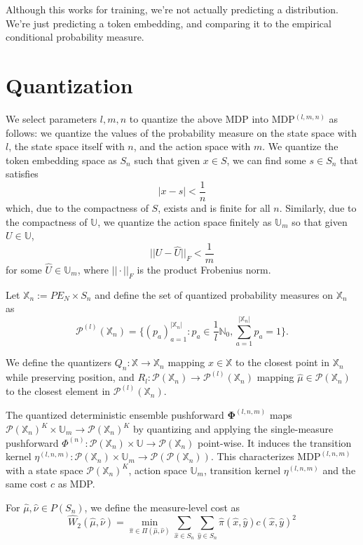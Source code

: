 \documentclass{article}
\begin{document}
Although this works for training, we're not actually predicting a distribution. We're just predicting a token embedding, and comparing it to the empirical conditional probability measure. 

\section{Quantization}

We select parameters $l, m, n$ to quantize the above MDP into MDP$^{(l, m, n)}$ as follows: we quantize the values of the probability measure on the state space with $l$, the state space itself with $n$, and the action space with $m$. 
We quantize the token embedding space as $S_n$ such that given $x \in S$, we can find some $s \in S_n$ that satisfies
$$|x - s| < \frac{1}{n}$$
which, due to the compactness of $S$, exists and is finite for all $n$. Similarly, due to the compactness of $\mathbb{U}$, we quantize the action space finitely as $\mathbb{U}_m$ so that given $U \in \mathbb{U}$,
$$||U - \hat U||_F < \frac{1}{m}$$
for some $\hat U \in \mathbb{U}_m$, where $||\cdot ||_F$ is the product Frobenius norm. 

Let $\mathbb{X}_n := PE_N \times S_n$ and define the set of quantized probability measures on $\mathbb{X}_n$ as 
$$\mathcal{P} ^{(l)}(\mathbb X_n) = \{(p_a)_{a = 1}^{|\mathbb X_n|}: p_a \in \frac{1}{l} \mathbb{N}_0, \sum_{a = 1}^{|\mathbb X_n|} p_a = 1\}.$$

We define the quantizers $Q_n : \mathbb{X} \to \mathbb{X}_n$ mapping $x \in \mathbb{X}$ to the closest point in $\mathbb{X}_n$ while preserving position, and $R_l : \mathcal P(\mathbb X _n) \to \mathcal P^{(l)}(\mathbb X _n)$ mapping $\hat \mu \in \mathcal P(\mathbb X _n)$ to the closest element in $\mathcal P^{(l)}(\mathbb X _n)$. 

The quantized deterministic ensemble pushforward $\bm \Phi^{(l, n, m)}$ maps $\mathcal P(\mathbb{X}_n)^K\times \mathbb U_m \to \mathcal P(\mathbb X_n)^K$ by quantizing and applying the single-measure pushforward $\Phi ^{(n)}: \mathcal P(\mathbb X_n) \times \mathbb U\to \mathcal P (\mathbb X_n)$ point-wise. It induces the transition kernel $\eta ^{(l, n, m)} : \mathcal P(\mathbb{X}_n)\times \mathbb U_m \to \mathcal P(\mathcal P(\mathbb X_n))$. This characterizes $\text{MDP}^{(l, n, m)}$ with a state space $\mathcal P(\mathbb{X}_n)^K$, action space $\mathbb U_m$, transition kernel $\eta^{(l, n, m)}$ and the same cost $c$ as MDP.

For $\hat \mu, \hat \nu \in P(S_n)$, we define the measure-level cost as 
$$\hat W_2 (\hat \mu, \hat \nu) = \min _{\hat \pi \in \Pi (\hat \mu, \hat \nu)} \sum _ {\hat x \in S_n}  \sum _ {\hat y \in S_n} \hat \pi (\hat x, \hat y)c(\hat x, \hat y)^2$$
\end{document}
